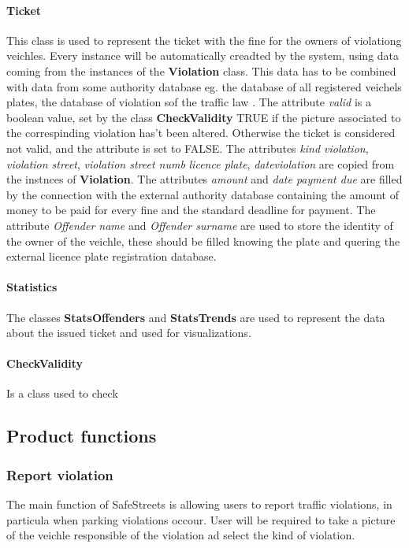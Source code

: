 \paragraph{Ticket}
This class is used to represent the ticket with the fine for the owners of violationg veichles. Every instance will be automatically creadted by the system, using data coming from the instances of the \textbf{Violation} class. This data has to be combined with data from some authority database eg. the database of all registered veichels plates, the database of violation sof the traffic law .
The attribute \textit{valid} is a boolean value, set by the class \textbf{CheckValidity} TRUE if the picture associated to the correspinding violation has't been altered. Otherwise the ticket is considered not valid, and the attribute is set to FALSE.
The attributes \textit{kind violation}, \textit{violation street}, \textit{violation street numb} \textit{licence plate}, \textit{dateviolation} are copied from the instnces of \textbf{Violation}.
The attributes \textit{amount} and \textit{date payment due} are filled by the connection with the external authority database containing the amount of money to be paid for every fine and the standard deadline for payment.
The attribute \textit{Offender name} and \textit{Offender surname} are used to store the identity of the owner of the veichle, these should be filled knowing the plate and quering the external licence plate registration database.

\paragraph{Statistics}
The classes \textbf{StatsOffenders} and \textbf{StatsTrends} are used to represent the data about the issued ticket and used for visualizations.

\paragraph{CheckValidity}
Is a class used to check 


\subsection{Product functions}

\subsubsection{Report violation}
The main function of SafeStreets is allowing users to report traffic violations, in particula when parking violations occour.
 User will be required to take a picture of the veichle responsible of the violation ad select the kind of violation.

